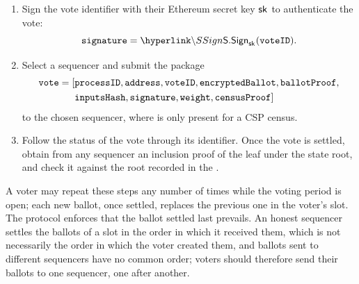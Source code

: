 \begin{enumerate}
	computed and that $\ballot$ satisfies the ballot rules of $\ballotmode$:
	\begin{align*}
		\ballotproof = {} & \hlget{\PProve}\bigl(\hlget{\ballotcircuit},\\
		& \witness = (\ballot, k, \processid, \ballotmode, \epk,\\ & \phantom{\witness = (}\weight, \encryptedballot), \\
		& \publicinputs = (\address, \voteid, \ballotinputshash)\bigr).
	\end{align*}
	\item Sign the vote identifier with their Ethereum secret key ${\sf{sk}^{}}$ to authenticate the vote:
	\[ \signature = \hlget{\SSign}_{\sk}(\voteid). \]
	\item Select a sequencer and submit the package
	\begin{align*} \texttt{vote} = [&\texttt{processID}, \texttt{address}, \texttt{voteID}, \texttt{encryptedBallot}, \texttt{ballotProof},\\ &\texttt{inputsHash}, \texttt{signature}, \texttt{weight}, \texttt{censusProof}] \end{align*}
	to the chosen sequencer, where \censusproof is only present for a \ac{CSP} census.
	\item Follow the status of the vote through its identifier. Once the vote is settled, obtain from any sequencer an inclusion proof of the leaf \voteid under the state root, and check it against the root recorded in the \processregistry.
\end{enumerate}
A voter may repeat these steps any number of times while the voting period is open; each new ballot, once settled, replaces the previous one in the voter's slot. The protocol enforces that the ballot settled last prevails. An honest sequencer settles the ballots of a slot in the order in which it received them, which is not necessarily the order in which the voter created them, and ballots sent to different sequencers have no common order; voters should therefore send their ballots to one sequencer, one after another.\\

